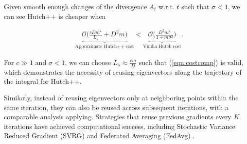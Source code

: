 Given smooth enough changes of the divergence $A_t$ w.r.t. $t$ such that $\sigma<1$, we can see Hutch++ is cheaper when

\begin{equation} \begin{aligned} & \underbrace{\mathcal{O}\bigg(\frac{c Dm^2}{L_s}+D^2m\bigg)}_{\text{Approximate Hutch++ cost}}<\underbrace{\mathcal{O}\bigg(\frac{D^2 m^2}{1+m\sigma^2}\bigg)}_{\text{Vinilla Hutch cost}}. \end{aligned}\label{eqn:costcomp} \end{equation}


For $c\gg 1$ and $\sigma<1$, we can choose $ L_s\approx \frac{cm}{D}$ such that (\ref{eqn:costcomp}) is valid, which demonstrates the necessity of reusing eigenvectors along the trajectory of the integral for Hutch++.

Similarly, instead of reusing eigenvectors only at neighboring points within the same iteration, they can also be reused across subsequent iterations, with a comparable analysis applying. Strategies that reuse previous gradients every \(K\) iterations have achieved computational success, including Stochastic Variance Reduced Gradient (SVRG) \cite{johnson2013accelerating} and Federated Averaging (FedAvg) \cite{mcmahan2017communication, li2019convergence}.


